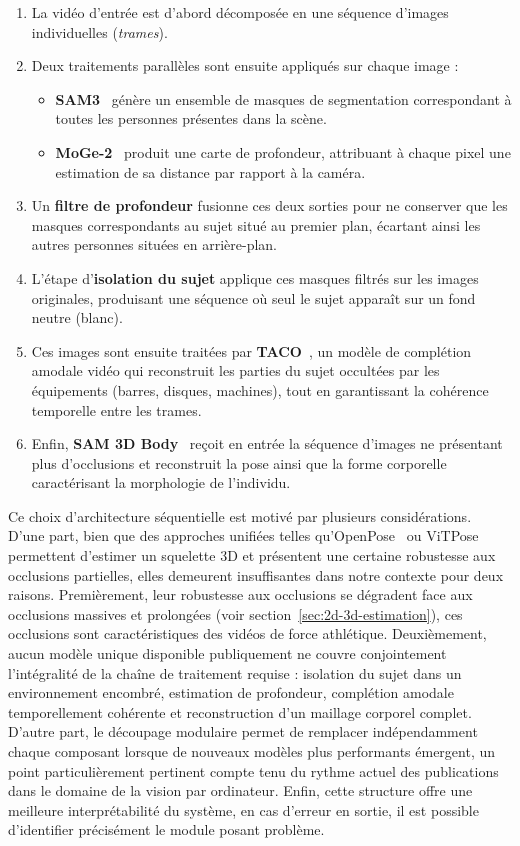 \begin{enumerate}
  \item La vidéo d'entrée est d'abord décomposée en une séquence d'images individuelles (\textit{trames}).
  \item Deux traitements parallèles sont ensuite appliqués sur chaque image :
  \begin{itemize}
    \item \textbf{SAM3}~\cite{SAM3-2025} génère un ensemble de masques de segmentation correspondant à toutes les personnes présentes dans la scène.
    \item \textbf{MoGe-2}~\cite{MoGe2-2025} produit une carte de profondeur, attribuant à chaque pixel une estimation de sa distance par rapport à la caméra.
  \end{itemize}
  \item Un \textbf{filtre de profondeur} fusionne ces deux sorties pour ne conserver que les masques correspondants au sujet situé au premier plan, écartant ainsi les autres personnes situées en arrière-plan.
  \item L'étape d'\textbf{isolation du sujet} applique ces masques filtrés sur les images originales, produisant une séquence où seul le sujet apparaît sur un fond neutre (blanc).
  \item Ces images sont ensuite traitées par \textbf{TACO}~\cite{TACO-2025}, un modèle de complétion amodale vidéo qui reconstruit les parties du sujet occultées par les équipements (barres, disques, machines), tout en garantissant la cohérence temporelle entre les trames.
  \item Enfin, \textbf{SAM 3D Body}~\cite{SAM-3D-Body-2026} reçoit en entrée la séquence d'images ne présentant plus d'occlusions et reconstruit la pose ainsi que la forme corporelle caractérisant la morphologie de l'individu.
\end{enumerate}

Ce choix d'architecture séquentielle est motivé par plusieurs considérations. D'une part, bien que des approches unifiées telles qu'OpenPose~\cite{OpenPose-2019} ou ViTPose~\cite{ViTPose-2022} permettent d'estimer un squelette 3D et présentent une certaine robustesse aux occlusions partielles, elles demeurent insuffisantes dans notre contexte pour deux raisons. Premièrement, leur robustesse aux occlusions se dégradent face aux occlusions massives et prolongées (voir section~\ref{sec:2d-3d-estimation}), ces occlusions sont caractéristiques des vidéos de force athlétique. Deuxièmement, aucun modèle unique disponible publiquement ne couvre conjointement l'intégralité de la chaîne de traitement requise : isolation du sujet dans un environnement encombré, estimation de profondeur, complétion amodale temporellement cohérente et reconstruction d'un maillage corporel complet. D'autre part, le découpage modulaire permet de remplacer indépendamment chaque composant lorsque de nouveaux modèles plus performants émergent, un point particulièrement pertinent compte tenu du rythme actuel des publications dans le domaine de la vision par ordinateur. Enfin, cette structure offre une meilleure interprétabilité du système, en cas d'erreur en sortie, il est possible d'identifier précisément le module posant problème.

